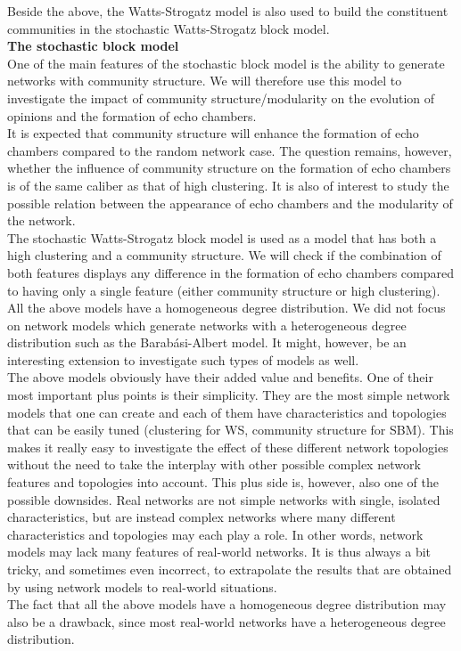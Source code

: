 \documentclass[11 pt , letterpaper , twoside , openright]{book}
\begin{document}
\newline
Beside the above, the Watts-Strogatz model is also used to build the constituent communities in the stochastic Watts-Strogatz block model.\\
\newline
\textbf{The stochastic block model}\\
\newline
One of the main features of the stochastic block model is the ability to generate networks with community structure. We will therefore use this model to investigate the impact of community structure/modularity on the evolution of opinions and the formation of echo chambers.\\
\newline
It is expected that community structure will enhance the formation of echo chambers compared to the random network case. The question remains, however, whether the influence of community structure on the formation of echo chambers is of the same caliber as that of high clustering. It is also of interest to study the possible relation between the appearance of echo chambers and the modularity of the network.\\
\newline
The stochastic Watts-Strogatz block model is used as a model that has both a high clustering and a community structure. We will check if the combination of both features displays any difference in the formation of echo chambers compared to having only a single feature (either community structure or high clustering).\\
\newline
All the above models have a homogeneous degree distribution. We did not focus on network models which generate networks with a heterogeneous degree distribution such as the Barab\'{a}si-Albert model. It might, however, be an interesting extension to investigate such types of models as well.\\
\newline
The above models obviously have their added value and benefits. One of their most important plus points is their simplicity. They are the most simple network models that one can create and each of them have characteristics and topologies that can be easily tuned (clustering for WS, community structure for SBM). This makes it really easy to investigate the effect of these different network topologies without the need to take the interplay with other possible complex network features and topologies into account. This plus side is, however, also one of the possible downsides. Real networks are not simple networks with single, isolated characteristics, but are instead complex networks where many different characteristics and topologies may each play a role. In other words, network models may lack many features of real-world networks. It is thus always a bit tricky, and sometimes even incorrect, to extrapolate the results that are obtained by using network models to real-world situations.\\
\newline
The fact that all the above models have a homogeneous degree distribution may also be a drawback, since most real-world networks have a heterogeneous degree distribution.
\end{document}
